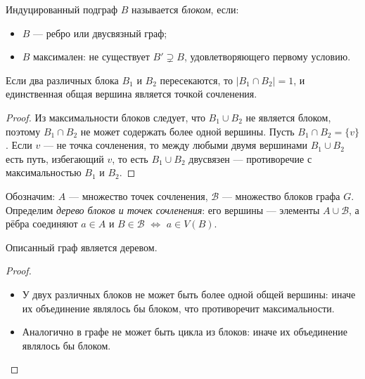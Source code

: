 \begin{Definition}{}{}
	Индуцированный подграф $B$ называется \emph{блоком}, если:
	\begin{itemize}
		\item $B$ --- ребро или двусвязный граф;
		\item $B$ максимален: не существует $B' \supsetneq B$,
		удовлетворяющего первому условию.
	\end{itemize}
\end{Definition}

\begin{Statement}{}{}
	Если два различных блока $B_1$ и $B_2$ пересекаются,
	то $|B_1 \cap B_2| = 1$, и единственная общая вершина
	является точкой сочленения.
\end{Statement}
\begin{proof}
	Из максимальности блоков следует, что $B_1 \cup B_2$ не является
	блоком, поэтому $B_1 \cap B_2$ не может содержать более одной
	вершины.
	Пусть $B_1 \cap B_2 = \{v\}$. Если $v$ --- не точка сочленения,
	то между любыми двумя вершинами $B_1 \cup B_2$ есть путь,
	избегающий $v$, то есть $B_1 \cup B_2$ двусвязен --- противоречие
	с максимальностью $B_1$ и $B_2$.
\end{proof}

Обозначим: $A$ --- множество точек сочленения, $\mathcal{B}$ ---
множество блоков графа $G$. Определим \emph{дерево блоков и точек
	сочленения}: его вершины --- элементы $A \cup \mathcal{B}$, а рёбра
соединяют $a \in A$ и $B \in \mathcal{B}$ $\Leftrightarrow$ $a \in V(B)$.

\begin{Theorem}{}{}
	Описанный граф является деревом.
\end{Theorem}
\begin{proof}
	\begin{itemize}
		\item У двух различных блоков не может быть более одной общей вершины:
		иначе их объединение являлось бы блоком, что противоречит максимальности.
		\item Аналогично в графе не может быть цикла из блоков:
		иначе их объединение являлось бы блоком.
	\end{itemize}
\end{proof}